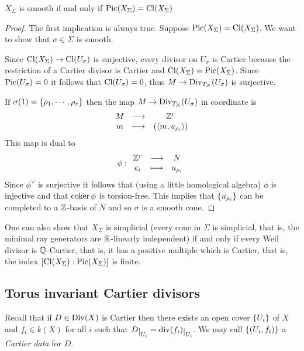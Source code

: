 \begin{proposition}[]\label{PrSmoothnessOfToricVarietyIsEquivalentToPicardBeingTheClassGroup}
$X_\Sigma$ is smooth if and only if $\operatorname{Pic}(X_\Sigma)=\operatorname{Cl}(X_\Sigma)$
\end{proposition}
\begin{proof}
The first implication is always true. Suppose $\operatorname{Pic}(X_\Sigma)=\operatorname{Cl}(X_\Sigma)$. We want to show that $\sigma\in \Sigma$ is smooth.

Since $\operatorname{Cl}(X_\Sigma)\to \operatorname{Cl}(U_\sigma)$ is surjective, every divisor on $U_\sigma$ is Cartier because the restriction of a Cartier divisor is Cartier and $\operatorname{Cl}(X_\Sigma)=\operatorname{Pic}(X_\Sigma)$. Since $\operatorname{Pic}(U_\sigma)=0$ it follows that $\operatorname{Cl}(U_\sigma)=0$, thus $M\to \operatorname{Div}_{T_N}(U_\sigma)$ is surjective.

If $\sigma(1)=\left\{{\rho_1,\cdots, \rho_r}\right\}$ then the map $M\to \operatorname{Div}_{T_N}(U_\sigma)$ in coordinate is
\[\begin{array}{ccc} {M} & \longrightarrow & {\mathbb{Z}^r}\\ {m} & \longmapsto & {(\left\langle {m,u_{\rho_i}}\right\rangle)} \end{array}\]
This map is dual to
\[\phi:\begin{array}{ccc} {\mathbb{Z}^r} & \longrightarrow & {N}\\ {e_i} & \longmapsto & {u_{\rho_i}} \end{array}\]
Since $\phi^\vee$ is surjective it follows that (using a little homological algebra) $\phi$ is injective and that $\operatorname{coker}\phi$ is torsion-free. This implies that $\left\{{u_{\rho_i}}\right\}$ can be completed to a $\mathbb{Z}$-basis of $N$ and so $\sigma$ is a smooth cone.
\end{proof}


\begin{remark}
One can also show that $X_\Sigma$ is simplicial (every cone in $\Sigma$ is simplicial, that is, the minimal ray generators are $\mathbb{R}$-linearly independent) if and only if every Weil divisor is $\mathbb{Q}$-Cartier, that is, it has a positive multiple which is Cartier, that is, the index $[\operatorname{Cl}(X_\Sigma):\operatorname{Pic}(X_\Sigma)]$ is finite. 
\end{remark}



\subsection{Torus invariant Cartier divisors}

Recall that if $D\in \operatorname{Div}(X)$ is Cartier then there exists an open cover $\left\{{U_i}\right\}$ of $X$ and $f_i\in k(X)$ for all $i$ such that $D\res{U_i}=\div(f_i)\res{U_i}$. We may call $\left\{{(U_i,f_i)}\right\}$ a \textit{Cartier data} for $D$.

